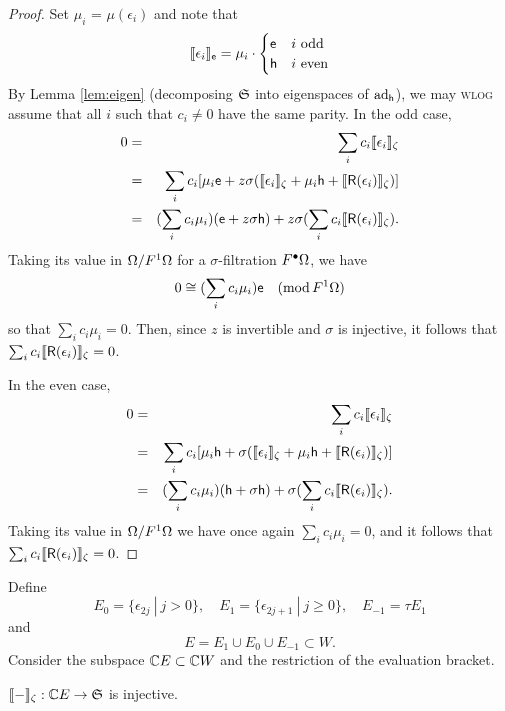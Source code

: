 \begin{proof}
Set $\mu_i$ = $\mu(\epsilon_i)$ and note that 
\[
        \llbracket{\epsilon_i}\rrbracket_{\mathsf{e}} = \mu_i \cdot \begin{cases}
                \mathsf{e}&i\ \mathrm{odd}\\
        \mathsf{h}&i\ \mathrm{even}\end{cases}
\]
By Lemma \ref{lem:eigen} (decomposing $\mathfrak{S}$ into eigenspaces of $\operatorname{\mathrm{ad}}_{\mathsf{h}}$), we may \textsc{wlog}
assume that all $i$ such that $c_i\neq0$ have the same parity. In the odd case,
\begin{eqnarray*}
        0 &=& \sum_i c_i \llbracket{\epsilon_i}\rrbracket_\zeta
        \\&=& \sum_i c_i [ \mu_i \mathsf{e} + z \sigma (\llbracket{\epsilon_i}\rrbracket_\zeta + \mu_i\mathsf{h} + \llbracket{\mathsf{R}(\epsilon_i)}\rrbracket_\zeta) ]
        \\&=& (\sum_i c_i \mu_i)(\mathsf{e} + z \sigma \mathsf{h}) + z \sigma (\sum_i c_i \llbracket{\mathsf{R}(\epsilon_i)}\rrbracket_\zeta).
\end{eqnarray*} 
Taking its value in $\Omega/F^1\Omega$ for a $\sigma$-filtration $F^\bullet\Omega$, we have
\[
        0 \cong (\sum_i c_i \mu_i) \mathsf{e}\quad(\operatorname{\mathrm{mod}} F^1\Omega)
\]
so that $\sum_i c_i \mu_i = 0$. Then, since $z$ is invertible and $\sigma$ is injective,
it follows that $\sum_i c_i \llbracket{\mathsf{R}(\epsilon_i)}\rrbracket_\zeta = 0$.

In the even case,
\begin{eqnarray*}
        0 &=& \sum_i c_i \llbracket{\epsilon_i}\rrbracket_\zeta
       \\ &=& \sum_i c_i [ \mu_i \mathsf{h} + \sigma (\llbracket{\epsilon_i}\rrbracket_\zeta + \mu_i \mathsf{h} + \llbracket{\mathsf{R}(\epsilon_i)}\rrbracket_\zeta) ]
       \\ &=& (\sum_i c_i \mu_i)(\mathsf{h} + \sigma \mathsf{h}) + \sigma (\sum_i c_i \llbracket{\mathsf{R}(\epsilon_i)}\rrbracket_\zeta).
\end{eqnarray*}
Taking its value in $\Omega/F^1\Omega$ we have once again $\sum_i c_i \mu_i = 0$, and
it follows that $\sum_i c_i \llbracket{\mathsf{R}(\epsilon_i)}\rrbracket_\zeta = 0$.
\end{proof}

Define
\[
E_0  = \{ \epsilon_{2j}  \ |\ j > 0 \},\quad
E_1  = \{ \epsilon_{2j+1}\ |\ j \ge 0 \},\quad
E_{-1}= \tau E_1
\]
and \[E = E_1\cup E_0\cup E_{-1} \subset W.\] Consider the subspace ${{\mathbb{C}}{}E}\subset {{\mathbb{C}}{}W}$ and the
restriction of the evaluation bracket.

\begin{lem}\label{lem:bkt-inj} $\llbracket{-}\rrbracket_\zeta:{{\mathbb{C}}{}E}\to\mathfrak{S}$ is injective. \end{lem}

